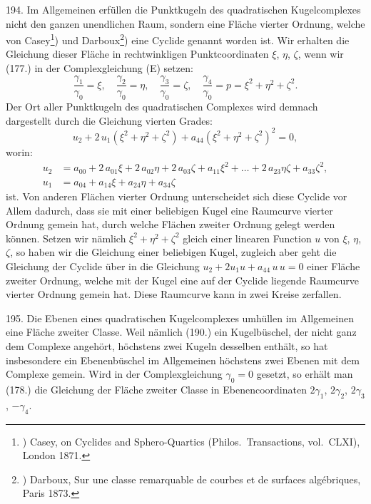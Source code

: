 194. Im Allgemeinen erf\"ullen die Punktkugeln des
quadratischen Kugelcomplexes nicht den ganzen unendlichen
Raum, sondern eine Fl\"ache vierter Ordnung, welche von
Casey\footnote{) Casey, on Cyclides and Sphero-Quartics (Philos.\ Transactions,
vol.\ CLXI), London 1871.})
und Darboux\footnote{) Darboux, Sur une classe remarquable de courbes et de
surfaces alg\'ebriques, Paris 1873.})
eine {\glqq}Cyclide{\grqq} genannt worden ist.
Wir erhalten die Gleichung dieser Fl\"ache in rechtwinkligen
Punktcoordinaten $\xi$, $\eta$, $\zeta$, wenn wir (177.) in der
Complexgleichung (E) setzen:
\[
\frac{\gamma_1}{\gamma_0} = \xi, \quad
\frac{\gamma_2}{\gamma_0} = \eta, \quad
\frac{\gamma_3}{\gamma_0} = \zeta, \quad
\frac{\gamma_4}{\gamma_0} = p = \xi^2+\eta^2+\zeta^2.
\]
Der Ort aller Punktkugeln des quadratischen Complexes wird
demnach dargestellt durch die Gleichung vierten Grades:
\[
u_2 + 2\,u_1 (\xi^2+\eta^2+\zeta^2)
+ a_{44} (\xi^2+\eta^2+\zeta^2)^2 = 0,
\]
worin:
\begin{align*}
u_2 &= a_{00} + 2\,a_{01}\xi + 2\,a_{02}\eta + 2\,a_{03}\zeta + a_{11}\xi^2
+ \ldots + 2\,a_{23} \eta\zeta + a_{33}\zeta^2, \\
u_1 &= a_{04} + a_{14}\xi + a_{24}\eta + a_{34}\zeta
\end{align*}
ist. Von anderen Fl\"achen vierter Ordnung unterscheidet sich
diese Cyclide vor Allem dadurch, dass sie mit einer beliebigen
Kugel eine Raumcurve vierter Ordnung gemein hat, durch
welche Fl\"achen zweiter Ordnung gelegt werden k\"onnen.
Setzen wir n\"amlich $\xi^2 + \eta^2 + \zeta^2$ gleich einer linearen
Function $u$ von $\xi$, $\eta$, $\zeta$, so haben wir die Gleichung einer
beliebigen Kugel, zugleich aber geht die Gleichung der Cyclide
\"uber in die Gleichung $u_2 + 2u_1 u + a_{44}\,u\,u =0$ einer Fl\"ache
zweiter Ordnung, welche mit der Kugel eine auf der Cyclide
liegende Raumcurve vierter Ordnung gemein hat. Diese
Raumcurve kann in zwei Kreise zerfallen.

195. Die Ebenen eines quadratischen Kugelcomplexes
umh\"ullen im Allgemeinen eine Fl\"ache zweiter Classe. Weil
n\"amlich (190.) ein Kugelb\"uschel, der nicht ganz dem Complexe
angeh\"ort, h\"ochstens zwei Kugeln desselben enth\"alt, so
hat insbesondere ein Ebenenb\"uschel im Allgemeinen h\"ochstens
zwei Ebenen mit dem Complexe gemein. Wird in der Complexgleichung
$\gamma_0 = 0$ gesetzt, so erh\"alt man (178.) die Gleichung
der Fl\"ache zweiter Classe in Ebenencoordinaten $2\gamma_1$,
$2\gamma_2$, $2\gamma_3$, $-\gamma_4$.

